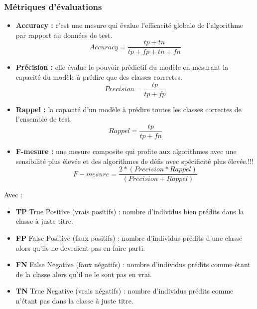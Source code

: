         \subsubsection{Métriques d'évaluations}
            \begin{itemize}
                \item{\textbf{Accuracy :} }c'est une mesure qui évalue l'efficacité globale de l'algorithme par rapport au données de test.
                    \[ Accuracy = \frac{tp+tn} {tp+fp+tn+fn} \]
                \item{\textbf{Précision :} }elle évalue le pouvoir prédictif du modèle en mesurant la capacité du modèle à prédire que des classes correctes.
                    \[ Precision = \frac{tp} {tp+fp} \]
                \item{\textbf{Rappel :} }la capacité d’un modèle à prédire toutes les classes correctes de l'ensemble de test.
                    \[ Rappel = \frac{tp} {tp+fn} \]
                \item{\textbf{F-mesure :} }une mesure composite qui profite aux algorithmes avec une sensibilité plus élevée et des algorithmes de défis avec spécificité plus élevée.!!!
                    \[ F-mesure = \frac{2 * (Precision * Rappel)} {(Precision + Rappel)} \]
            \end{itemize}
            Avec :
            \begin{itemize}
                \item{\textbf{TP }True Positive (vrais positifs) :} nombre d'individus bien prédits dans la classe à juste titre.
                \item{\textbf{FP }False Positive (faux positifs) :} nombre d'individus prédits d'une classe alors qu'ils ne devraient pas en faire parti.
                \item{\textbf{FN }False Negative (faux négatifs) :} nombre d'individus prédits comme étant de la classe alors qu'il ne le sont pas en vrai.
                \item{\textbf{TN }True Negative (vrais négatifs) :} nombre d'individus prédits comme n'étant pas dans la classe à juste titre.
            \end{itemize}

